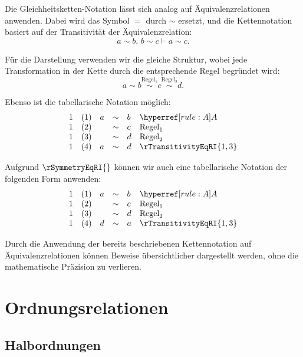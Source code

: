 \documentclass[main.tex]{subfiles}
\begin{document}
Die Gleichheitsketten-Notation lässt sich analog auf Äquivalenzrelationen anwenden. Dabei wird das Symbol \(=\) durch \(\sim\) ersetzt, und die Kettennotation basiert auf der Transitivität der Äquivalenzrelation:
\[
a \sim b, \, b \sim c \vdash a \sim c.
\]

Für die Darstellung verwenden wir die gleiche Struktur, wobei jede Transformation in der Kette durch die entsprechende Regel begründet wird:
\[
a \sim b \stackrel{\text{Regel}_1}{\sim} c \stackrel{\text{Regel}_2}{\sim} d.
\]

Ebenso ist die tabellarische Notation möglich:
\[
\begin{array}{llclll}
	1 & (1) & a & \sim & b & \rA \\
	1 & (2) &   & \sim & c & \text{Regel}_1 \\
	1 & (3) &   & \sim & d & \text{Regel}_2 \\
        1 & (4) & a & \sim & d & \rTransitivityEqRI{1,3} \\
\end{array}
\]

Aufgrund \(\rSymmetryEqRI{}\) können wir auch eine tabellarische Notation der folgenden Form anwenden:
\[
\begin{array}{llclll}
	1 & (1) & a & \sim & b & \rA \\
	1 & (2) &   & \sim & c & \text{Regel}_1 \\
	1 & (3) &   & \sim & d & \text{Regel}_2 \\
        1 & (4) & d & \sim & a & \rTransitivityEqRI{1,3} \\
\end{array}
\]

\begin{remark}
    Durch die Anwendung der bereits beschriebenen Kettennotation auf Äquivalenzrelationen können Beweise übersichtlicher dargestellt werden, ohne die mathematische Präzision zu verlieren.
\end{remark}

\section{Ordnungsrelationen}

\subsection{Halbordnungen}
\end{document}
